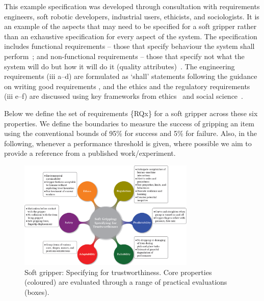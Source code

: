 \documentclass[letterpaper, 10 pt, conference]{ieeeconf}  %
\begin{document}
	This example specification was developed through consultation with requirements engineers, soft robotic developers, industrial users, ethicists, and sociologists. It is an example of the aspects that may need to be specified for a soft gripper rather than an exhaustive specification for every aspect of the system. 
	The specification includes functional requirements -- those that specify behaviour the system shall perform~\cite{ISO24765:2017}; and non-functional requirements -- those that specify not what the system will do but how it will do it (quality attributes)~\cite{ISO24765:2017}.
	The engineering requirements (iii a--d) are formulated as `shall' statements following the guidance on writing good requirements \cite{NASA2007}, and the ethics and the regulatory requirements (iii e--f) are discussed using key frameworks from ethics~\cite{Porter2023} and social science~\cite{Macrae2022}. 
	
	Below we define the set of requirements \{RQx\} for a soft gripper across these six properties.
	We define the boundaries to measure the success of gripping an item using the conventional bounds of 95\% for success and 5\% for failure. 
	Also, in the following, whenever a performance threshold is given, where possible we aim to provide a reference from a published work/experiment. 
	\begin{figure}
		\centering
		\includegraphics[width=0.75\textwidth]{figures/properties}%
		\caption{Soft gripper: Specifying for trustworthiness. Core properties (coloured) are evaluated through a range of practical evaluations (boxes). }
		\label{SR-spec}
	\end{figure}
	
\end{document}
